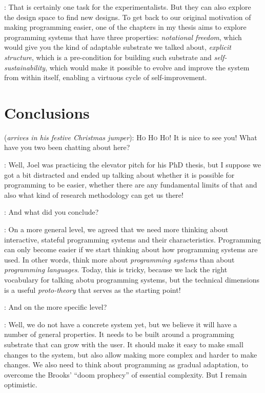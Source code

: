 \documentclass[runningheads]{llncs}
\newcommand{\T}{Tomas}
\newcommand{\J}{Joel}
\newcommand{\says}[2][gg]{\vspace{0.5em}\noindent\hangindent=0.5cm{\textsc{#1}}: #2}
\newcommand{\appears}[3][gg]{\vspace{0.5em}\noindent\hangindent=0.5cm{\textsc{#1}} (\emph{#2}): #3}
\begin{document}
\says[\J]{That is certainly one task for the experimentalists. But they can also explore the design space to find new designs. To get back to our original motivation of making programming easier, one of the chapters in my thesis aims to explore programming systems that have three properties: \emph{notational freedom}, which would give you the kind of adaptable substrate we talked about,
\emph{explicit structure}, which is a pre-condition for building such substrate and
\emph{self-sustainability}, which would make it possible to evolve and improve the system from
within itself, enabling a virtuous cycle of self-improvement.}

\section{Conclusions}

\appears[Alan]{arrives in his festive Christmas jumper}{\textsc{Ho Ho Ho!} It is nice to see you! What have you two been chatting about here?}

\says[\T]{Well, Joel was practicing the elevator pitch for his PhD thesis, but I suppose we got a bit distracted and ended up talking about whether it is possible for programming to be easier, whether there are any fundamental limits of that and also what kind of research methodology can get us there!}

\says[Alan]{And what did you conclude?}

\says[\J]{On a more general level, we agreed that we need more thinking about interactive, stateful programming systems and their characteristics. Programming can only become easier if we start thinking about how programming systems are used. In other words, think more about \emph{programming systems} than about \emph{programming languages}. Today, this is tricky, because we lack the right vocabulary for talking abotu programming systems, but the technical dimensions is a useful \emph{proto-theory} that serves as the starting point!}

\says[Alan]{And on the more specific level?}

\says[\J]{Well, we do not have a concrete system yet, but we believe it will have a number of general properties. It needs to be built around a programming substrate that can grow with the user. It should make it easy to make small changes to the system, but also allow making more complex and harder to make changes. We also need to think about programming as gradual adaptation, to overcome the Brooks' ``doom prophecy'' of essential complexity. But I remain optimistic.}
\end{document}
